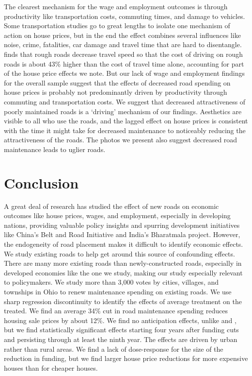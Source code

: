 The clearest mechanism for the wage and employment outcomes is through productivity like transportation costs, commuting times, and damage to vehicles.  Some transportation studies go to great lengths to isolate one mechanism of action on house prices, but in the end the effect combines several influences like noise, crime, fatalities, car damage and travel time that are hard to disentangle.  \cite{currier2023} finds that rough roads decrease travel speed so that the cost of driving on rough roads is about 43\% higher than the cost of travel time alone, accounting for part of the house price effects we note. But our lack of wage and employment findings for the overall sample suggest that the effects of decreased road spending on house prices is probably not predominantly driven by productivity through commuting and transportation costs. We suggest that decreased attractiveness of poorly maintained roads is a ‘driving’ mechanism of our findings. Aesthetics are visible to all who use the roads, and the lagged effect on house prices is consistent with the time it might take for decreased maintenance to noticeably reducing the attractiveness of the roads. The photos we present also suggest decreased road maintenance leads to uglier roads.


\section{Conclusion} \label{sec:conclusion}

A great deal of research has studied the effect of new roads on economic outcomes like house prices, wages, and employment, especially in developing nations, providing valuable policy insights and spurring development initiatives like China’s Belt and Road Initiative and India’s Bharatmala project.  However, the endogeneity of road placement makes it difficult to identify economic effects. We study existing roads to help get around this source of confounding effects. There are many more existing roads than newly-constructed roads, especially in developed economies like the one we study, making our study especially relevant to policymakers. We study more than 3,000 votes by cities, villages, and townships in Ohio to renew maintenance spending on existing roads. We use sharp regression discontinuity to identify the effects of average treatment on the treated.  We find an average 34\% cut in road maintenance spending reduces housing sale prices by about 12\%. We find no anticipation effects, unlike \cite{beenstock2016hedonic} and \cite{diao2017spatial}, but we find statistically significant effects starting four years after funding cuts and persisting through at least the ninth year.  The effects are driven by urban rather than rural areas. We find a lack of dose-response for the size of the reduction in funding, but we find larger house price reductions for more expensive houses than for cheaper houses.  

